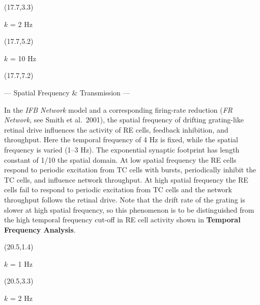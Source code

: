 \documentclass[a0]{a0poster}
\def\CHead#1{\begin{center} {\LARGE\color{DarkBlue} #1} \end{center}}
\begin{document}
\begin{textblock}{2.6}(17.7,3.3)
\begin{center}
$k$ = 2 Hz

\end{center}
\end{textblock}

\begin{textblock}{2.6}(17.7,5.2)
\begin{center}
$k$ = 10 Hz

\end{center}
\end{textblock}

\begin{textblock}{5.3}(17.7,7.2)
\CHead{--- Spatial Frequency \& Transmission --- } 
In the {\it IFB Network} model and a corresponding 
firing-rate reduction ({\it FR Network}, see Smith et al.~2001),
the spatial frequency of drifting grating-like retinal drive influences the 
activity of RE cells, feedback inhibition, and throughput.
Here the temporal frequency of 4 Hz is fixed, while the spatial
frequency is varied (1--3 Hz). 
The exponential synaptic footprint has length constant 
of 1/10 the spatial domain.
At low spatial frequency the RE cells respond to periodic excitation 
from TC cells with bursts, periodically inhibit the TC cells, and 
influence network throughput.  
At high spatial frequency the RE cells fail to respond 
to periodic excitation from TC cells and the
network throughput follows the retinal drive. 
Note that the drift rate of the grating is slower
at high spatial frequency, so this phenomenon is to be distinguished
from the high temporal frequency cut-off 
in RE cell activity shown in {\bf Temporal Frequency Analysis}. 
\end{textblock}

\begin{textblock}{2.6}(20.5,1.4)
\begin{center} $k$ = 1 Hz 
\end{center}
\end{textblock}

\begin{textblock}{2.6}(20.5,3.3)
\begin{center} $k$ = 2 Hz 
\end{center}
\end{textblock}
\end{document}
